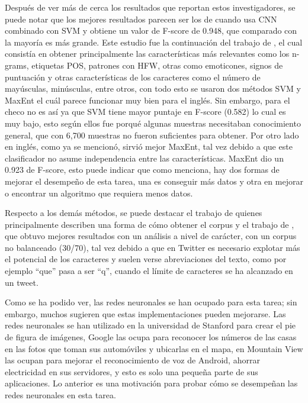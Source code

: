 \par Después de ver más de cerca los resultados que reportan estos investigadores, se puede notar que los mejores resultados parecen ser los de \textcite{poria2016deeper} cuando usa CNN combinado con SVM y obtiene un valor de  \gls{F-score} de 0.948, que comparado con la mayoría es más grande. Este estudio fue la continuación del trabajo de \textcite{ptavcek2014sarcasm}, el cual consistía en obtener principalmente las características más relevantes como los \gls{n-grams}, etiquetas \gls{POS}, patrones con \gls{HFW}, otras como emoticones, signos de puntuación y otras características de los caracteres como el número de mayúsculas, minúsculas, entre otros, con todo esto se usaron dos métodos \gls{SVM} y \gls{MaxEnt} el cuál parece funcionar muy bien para el inglés. Sin embargo, para el checo no es así ya que SVM tiene mayor puntaje en F-score (0.582) lo cual es muy bajo, esto según ellos fue porqué algunas muestras necesitaban conocimiento general, que con 6,700 muestras no fueron suficientes para obtener. Por otro lado en inglés, como ya se mencionó, sirvió mejor \gls{MaxEnt}, tal vez debido a que este clasificador no asume independencia entre las características. \gls{MaxEnt} dio un 0.923 de F-score, esto puede indicar que como \textcite{domingos2012few} menciona, hay dos formas de mejorar el desempeño de esta tarea, una es conseguir más datos y otra en mejorar o encontrar un algoritmo que requiera menos datos.

\par Respecto a los demás métodos, se puede destacar el trabajo de \textcite{reyes2012making} quienes principalmente describen una forma de cómo obtener el corpus y el trabajo de  \textcite{lopez2016character}, que obtuvo mejores resultados con un análisis a nivel de carácter, con un corpus no balanceado (30/70), tal vez debido a que en Twitter es necesario explotar más el potencial de los caracteres y suelen verse abreviaciones del texto, como por ejemplo  ``que'' pasa a ser ``q'', cuando el límite de caracteres se ha alcanzado en un tweet.

\par Como se ha podido ver, las redes neuronales se han ocupado para esta tarea; sin embargo, muchos sugieren que estas implementaciones pueden mejorarse. Las redes neuronales se han utilizado en la universidad de Stanford para crear el pie de figura de imágenes, Google las ocupa para reconocer los números de las casas en las fotos que toman sus automóviles y ubicarlas en el mapa, en Mountain View las ocupan para mejorar el reconocimiento de voz de  Android, ahorrar electricidad en sus servidores, y esto es solo una pequeña parte de sus aplicaciones. Lo anterior es una motivación para probar cómo se desempeñan las redes neuronales en esta tarea. 

